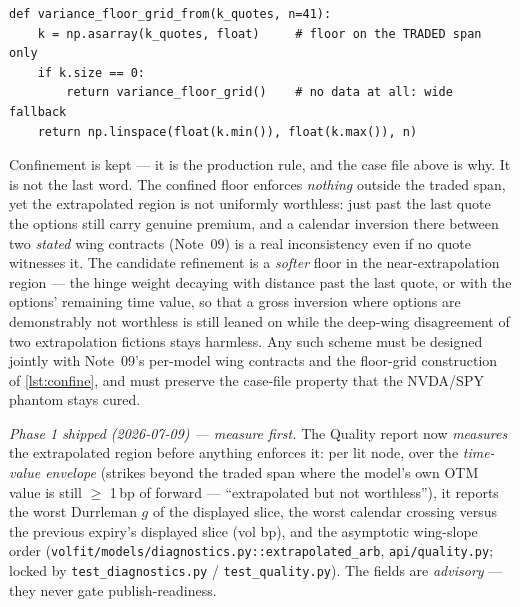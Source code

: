 \documentclass[11pt]{article}
\begin{document}
\begin{lstlisting}[caption={The confinement fix,
\texttt{variance\_floor\_grid\_from} (verified in \cref{app:ref}).},
label={lst:confine}]
def variance_floor_grid_from(k_quotes, n=41):
    k = np.asarray(k_quotes, float)     # floor on the TRADED span only
    if k.size == 0:
        return variance_floor_grid()    # no data at all: wide fallback
    return np.linspace(float(k.min()), float(k.max()), n)
\end{lstlisting}

\begin{remark}
\label{rem:openwings}
Confinement is kept --- it is the production rule, and the case file above is
why. It is not the last word. The confined floor enforces \emph{nothing}
outside the traded span, yet the extrapolated region is not uniformly
worthless: just past the last quote the options still carry genuine premium,
and a calendar inversion there between two \emph{stated} wing contracts
(Note~09) is a real inconsistency even if no quote witnesses it. The
candidate refinement is a \emph{softer} floor in the near-extrapolation
region --- the hinge weight decaying with distance past the last quote, or
with the options' remaining time value, so that a gross inversion where
options are demonstrably not worthless is still leaned on while the deep-wing
disagreement of two extrapolation fictions stays harmless. Any such scheme
must be designed jointly with Note~09's per-model wing contracts and the
floor-grid construction of \cref{lst:confine}, and must preserve the
case-file property that the NVDA/SPY phantom stays cured.

\emph{Phase 1 shipped (2026-07-09) — measure first.} The Quality report now
\emph{measures} the extrapolated region before anything enforces it: per lit
node, over the \emph{time-value envelope} (strikes beyond the traded span
where the model's own OTM value is still $\ge$ 1\,bp of forward ---
``extrapolated but not worthless''), it reports the worst Durrleman $g$ of
the displayed slice, the worst calendar crossing versus the previous
expiry's displayed slice (vol bp), and the asymptotic wing-slope order
(\nolinkurl{volfit/models/diagnostics.py::extrapolated\_arb},
\nolinkurl{api/quality.py}; locked by
\nolinkurl{test\_diagnostics.py} / \nolinkurl{test\_quality.py}). The fields
are \emph{advisory} --- they never gate publish-readiness.


\end{remark}
\end{document}
